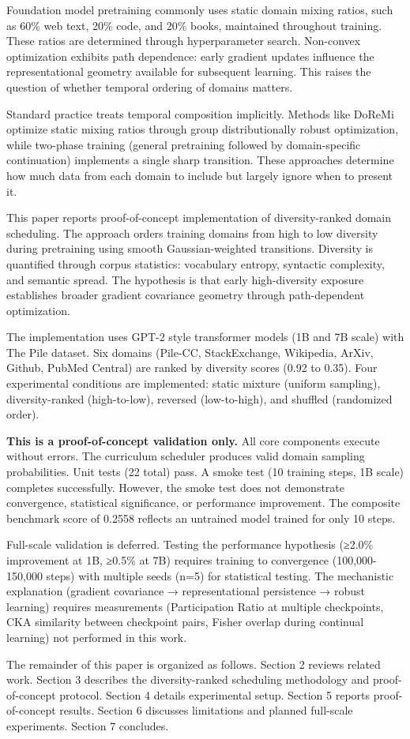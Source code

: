 
Foundation model pretraining commonly uses static domain mixing ratios, such as 60\% web text, 20\% code, and 20\% books, maintained throughout training. These ratios are determined through hyperparameter search. Non-convex optimization exhibits path dependence: early gradient updates influence the representational geometry available for subsequent learning. This raises the question of whether temporal ordering of domains matters.

Standard practice treats temporal composition implicitly. Methods like DoReMi optimize static mixing ratios through group distributionally robust optimization, while two-phase training (general pretraining followed by domain-specific continuation) implements a single sharp transition. These approaches determine how much data from each domain to include but largely ignore when to present it.

This paper reports proof-of-concept implementation of diversity-ranked domain scheduling. The approach orders training domains from high to low diversity during pretraining using smooth Gaussian-weighted transitions. Diversity is quantified through corpus statistics: vocabulary entropy, syntactic complexity, and semantic spread. The hypothesis is that early high-diversity exposure establishes broader gradient covariance geometry through path-dependent optimization.

The implementation uses GPT-2 style transformer models (1B and 7B scale) with The Pile dataset. Six domains (Pile-CC, StackExchange, Wikipedia, ArXiv, Github, PubMed Central) are ranked by diversity scores (0.92 to 0.35). Four experimental conditions are implemented: static mixture (uniform sampling), diversity-ranked (high-to-low), reversed (low-to-high), and shuffled (randomized order).

\textbf{This is a proof-of-concept validation only.} All core components execute without errors. The curriculum scheduler produces valid domain sampling probabilities. Unit tests (22 total) pass. A smoke test (10 training steps, 1B scale) completes successfully. However, the smoke test does not demonstrate convergence, statistical significance, or performance improvement. The composite benchmark score of 0.2558 reflects an untrained model trained for only 10 steps.

Full-scale validation is deferred. Testing the performance hypothesis (≥2.0\% improvement at 1B, ≥0.5\% at 7B) requires training to convergence (100,000-150,000 steps) with multiple seeds (n=5) for statistical testing. The mechanistic explanation (gradient covariance → representational persistence → robust learning) requires measurements (Participation Ratio at multiple checkpoints, CKA similarity between checkpoint pairs, Fisher overlap during continual learning) not performed in this work.

The remainder of this paper is organized as follows. Section 2 reviews related work. Section 3 describes the diversity-ranked scheduling methodology and proof-of-concept protocol. Section 4 details experimental setup. Section 5 reports proof-of-concept results. Section 6 discusses limitations and planned full-scale experiments. Section 7 concludes.
